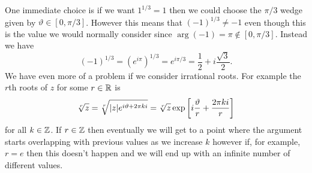 \documentclass{article}
\begin{document}
    One immediate choice is if we want \(1^{1/3} = 1\) then we could choose the \(\pi/3\) wedge given by \(\vartheta\in[0, \pi/3]\).
    However this means that \((-1)^{1/3} \ne -1\) even though this is the value we would normally consider since \(\arg(-1) = \pi \notin [0, \pi/3]\).
    Instead we have
    \[(-1)^{1/3} = (e^{i\pi})^{1/3} = e^{i\pi/3} = \frac{1}{2} + i\frac{\sqrt{3}}{2}.\]
    We have even more of a problem if we consider irrational roots.
    For example the \(r\)th roots of \(z\) for some \(r\in\mathbb{R}\) is
    \[\sqrt[r]{z} = \sqrt[r]{\abs{z}e^{i\vartheta + 2\pi ki}} = \sqrt[r]{z}\exp\left[i\frac{\vartheta}{r} + \frac{2\pi ki}{r}\right]\]
    for all \(k\in\mathbb{Z}\).
    If \(r\in\mathbb{Z}\) then eventually we will get to a point where the argument starts overlapping with previous values as we increase \(k\) however if, for example, \(r = e\) then this doesn't happen and we will end up with an infinite number of different values.
    
\end{document}
